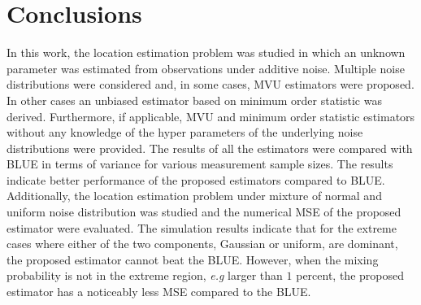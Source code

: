 \documentclass{article}
\begin{document}
\section{Conclusions}\label{sec:conclusions}
In this work, the location estimation problem was studied in which an unknown parameter was estimated from observations under additive noise. Multiple noise distributions were considered and, in some cases, MVU estimators were proposed. In other cases an unbiased estimator based on minimum order statistic was derived. Furthermore, if applicable, MVU and minimum order statistic estimators without any knowledge of the hyper parameters of the underlying noise distributions were provided. The results of all the estimators were compared with BLUE in terms of variance for various measurement sample sizes. The results indicate better performance of the proposed estimators compared to BLUE. Additionally, the location estimation problem under mixture of normal and uniform noise distribution was studied and the numerical MSE of the proposed estimator were evaluated. The simulation results indicate that for the extreme cases where either of the two components, Gaussian or uniform, are dominant, the proposed estimator cannot beat the BLUE. However, when the mixing probability is not in the extreme region, {\em e.g} larger than $1$ percent, the proposed estimator has a noticeably less MSE compared to the BLUE. 


%
%

\end{document}
